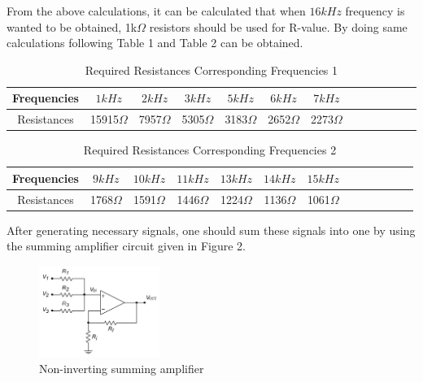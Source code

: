 \documentclass[letterpaper,12pt]{article}
\begin{document}
From the above calculations, it can be calculated that when \(16kHz\) frequency is wanted to be obtained, 1k\(\Omega \) resistors should be used for R-value. By doing same calculations following Table 1 and Table 2 can be obtained.
\begin{table}[H]
    \begin{center}
        \caption{Required Resistances Corresponding Frequencies 1}
        \vspace{2mm}
        \begin{tabular}{||c | c | c | c| c| c| c| c| c| c| c| c| c||} 
            \hline
            Frequencies &\(1kHz\) & \(2kHz\) & \(3kHz\)& \(5kHz\)& \(6kHz\)& \(7kHz\)\\ [0.5ex] 
            \hline\hline
            Resistances &15915\(\Omega\) & 7957\(\Omega\) & 5305\(\Omega\)& 3183\(\Omega\)& 2652\(\Omega\)& 2273\(\Omega\)\\
            \hline
        \end{tabular}
    \end{center}
\end{table}  
\vspace{-4mm}
\begin{table}[H]
    \begin{center}
        \caption{Required Resistances Corresponding Frequencies 2}
        \vspace{2mm}
        \begin{tabular}{||c | c | c | c| c| c| c| c| c| c| c| c| c||} 
            \hline
            Frequencies &\(9kHz\)& \(10kHz\)& \(11kHz\)& \(13kHz\)& \(14kHz\)& \(15kHz\)\\ [0.5ex] 
            \hline\hline
            Resistances &1768\(\Omega\)& 1591\(\Omega\)& 1446\(\Omega\)& 1224\(\Omega\)& 1136\(\Omega\)& 1061\(\Omega\)\\
            \hline
        \end{tabular}
    \end{center}
\end{table}  


After generating necessary signals, one should sum these signals into one by using the summing amplifier circuit given in Figure 2. 
\begin{figure}[H]
    \centering
    \includegraphics[width = 0.35\textwidth]{Non-Inv-Sum-Amp.jpg}
    \caption{Non-inverting summing amplifier}
\end{figure} 
\end{document}
